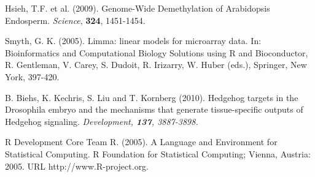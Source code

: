 \documentclass{bioinfo}
\begin{document}
\begin{thebibliography}{}
 Hsieh, T.F. et al. (2009).
Genome-Wide Demethylation of Arabidopsis Endosperm.
{\it Science}, {\bf 324}, 1451-1454.

Smyth, G. K. (2005). Limma: linear models for microarray data. In: Bioinformatics and Computational Biology Solutions using R and Bioconductor, R. Gentleman, V. Carey, S. Dudoit, R. Irizarry, W. Huber (eds.), Springer, New York, 397-420.

B. Biehs, K. Kechris, S. Liu and T. Kornberg (2010).
Hedgehog targets in the Drosophila embryo and the mechanisms that generate tissue-specific outputs of Hedgehog signaling. \it{Development}, {\bf 137}, 3887-3898.

R Development Core Team R. (2005).
A Language and Environment for Statistical Computing.
R Foundation for Statistical Computing; Vienna, Austria: 2005. URL http://www.R-project.org.


\end{thebibliography}
\end{document}
